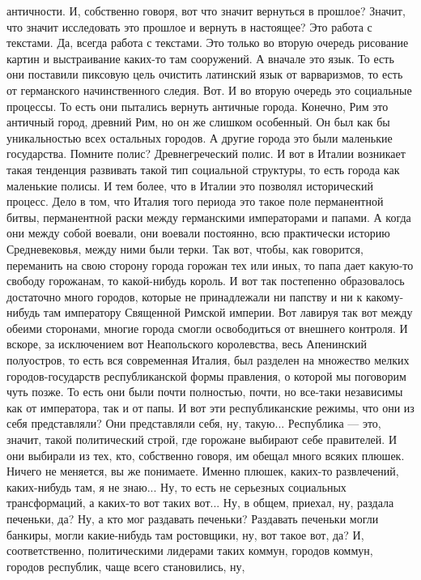 античности. И, собственно говоря, вот что значит вернуться в прошлое? Значит,
что значит исследовать это прошлое и вернуть в настоящее? Это работа с текстами.
Да, всегда работа с текстами. Это только во вторую очередь рисование картин и
выстраивание каких-то там сооружений. А вначале это язык. То есть они поставили
пиксовую цель очистить латинский язык от варваризмов, то есть от германского
начинственного следия. Вот. И во вторую очередь это социальные процессы. То есть
они пытались вернуть античные города. Конечно, Рим это античный город, древний
Рим, но он же слишком особенный. Он был как бы уникальностью всех остальных
городов. А другие города это были маленькие государства. Помните полис?
Древнегреческий полис. И вот в Италии возникает такая тенденция развивать такой
тип социальной структуры, то есть города как маленькие полисы. И тем более, что
в Италии это позволял исторический процесс. Дело в том, что Италия того периода
это такое поле перманентной битвы, перманентной раски между германскими
императорами и папами. А когда они между собой воевали, они воевали постоянно,
всю практически историю Средневековья, между ними были терки. Так вот, чтобы,
как говорится, переманить на свою сторону города горожан тех или иных, то папа
дает какую-то свободу горожанам, то какой-нибудь король. И вот так постепенно
образовалось достаточно много городов, которые не принадлежали ни папству и ни к
какому-нибудь там императору Священной Римской империи. Вот лавируя так вот
между обеими сторонами, многие города смогли освободиться от внешнего контроля.
И вскоре, за исключением вот Неапольского королевства, весь Апенинский
полуостров, то есть вся современная Италия, был разделен на множество мелких
городов-государств республиканской формы правления, о которой мы поговорим чуть
позже. То есть они были почти полностью, почти, но все-таки независимы как от
императора, так и от папы. И вот эти республиканские режимы, что они из себя
представляли? Они представляли себя, ну, такую... Республика — это, значит,
такой политический строй, где горожане выбирают себе правителей. И они выбирали
из тех, кто, собственно говоря, им обещал много всяких плюшек. Ничего не
меняется, вы же понимаете. Именно плюшек, каких-то развлечений, каких-нибудь
там, я не знаю... Ну, то есть не серьезных социальных трансформаций, а каких-то
вот таких вот... Ну, в общем, приехал, ну, раздала печеньки, да? Ну, а кто мог
раздавать печеньки? Раздавать печеньки могли банкиры, могли какие-нибудь там
ростовщики, ну, вот такое вот, да? И, соответственно, политическими лидерами
таких коммун, городов коммун, городов республик, чаще всего становились, ну,
